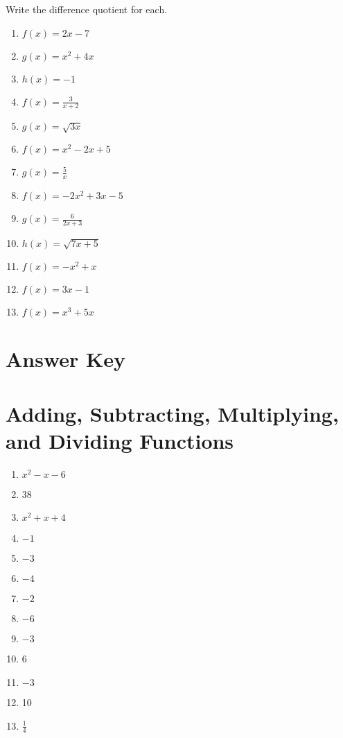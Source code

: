 Write the difference quotient for each.
\begin{multicols}{2}
\begin{enumerate}
	\item $f(x) = 2x - 7$
	\item $g(x) = x^2 + 4x$
	\item $h(x) = -1$
	\item $f(x) = \frac{3}{x+2}$
	\item $g(x) = \sqrt{3x}$
	\item $f(x) = x^2 - 2x + 5$
	\item $g(x) = \frac{5}{x}$
	\item $f(x) = -2x^2 + 3x - 5$
	\item $g(x) = \frac{6}{2x+3}$
	\item $h(x) = \sqrt{7x+5}$
	\item $f(x) = -x^2 + x$
	\item $f(x) = 3x - 1$
	\item $f(x) = x^3 + 5x$
\end{enumerate}
\end{multicols}

\newpage


\section{Answer Key}

\section*{Adding, Subtracting, Multiplying, and Dividing Functions}

\begin{multicols}{2}
\begin{enumerate}
    \item $x^2-x-6$
    \item 38
    \item $x^2+x+4$
    \item $-1$
     \item $-3$
     \item $-4$
     \item $-2$
     \item $-6$
     \item $-3$
    \item 6
    \item $-3$
    \item 10
    \item $\frac{1}{4}$
\end{enumerate}
\end{multicols}

